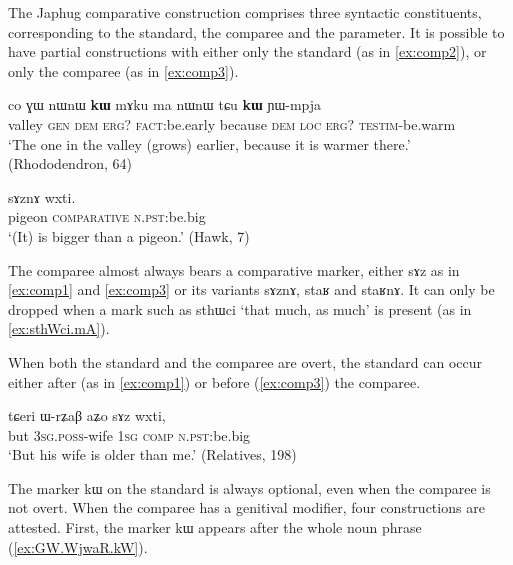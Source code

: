 \documentclass[oldfontcommands,oneside,a4paper,11pt]{article}
\newcommand{\ipa}[1]{{\phon #1}} %
\begin{document}
 

The Japhug comparative construction comprises three syntactic constituents, corresponding to the standard, the comparee and the parameter. It is possible to have partial constructions with either only the standard (as in \ref{ex:comp2}), or only the comparee (as in \ref{ex:comp3}).

 \begin{exe}
\ex \label{ex:comp2}
\gll 
\ipa{co}  	\ipa{ɣɯ}  	\ipa{nɯnɯ}  	\ipa{\textbf{kɯ}}  	\ipa{mɤku}  	\ipa{ma}  	\ipa{nɯnɯ} \ipa{tɕu}  	\ipa{\textbf{kɯ}}  	\ipa{ɲɯ-mpja}  \\
valley \textsc{gen} \textsc{dem} \textsc{erg?} \textsc{fact}:be.early because \textsc{dem} \textsc{loc} \textsc{erg?} \textsc{testim}-be.warm \\
\glt `The one in the valley (grows) earlier, because it is warmer there.' (Rhododendron, 64)
\end{exe}

\begin{exe}
\ex \label{ex:comp3}
\gll  \ipa{qɤjdo}  	\ipa{sɤznɤ}  	\ipa{wxti.}     \\
pigeon \textsc{comparative} \textsc{n.pst:}be.big \\
\glt `(It) is bigger than a pigeon.' (Hawk, 7)
\end{exe}


The comparee almost always bears a comparative marker, either \ipa{sɤz} as in \ref{ex:comp1} and \ref{ex:comp3} or its variants \ipa{sɤznɤ}, \ipa{staʁ} and \ipa{staʁnɤ}. It can only be dropped when a mark such as \ipa{sthɯci} `that much, as much' is present (as in \ref{ex:sthWci.mA}).

 When both the standard and the comparee are overt, the standard can occur either after (as in  \ref{ex:comp1}) or before (\ref{ex:comp3}) the comparee.  
 
\begin{exe}
\ex \label{ex:comp3}
\gll 
\ipa{tɕeri}  	\ipa{ɯ-rʑaβ}  	\ipa{aʑo}  	\ipa{sɤz}  	\ipa{wxti,}  \\
but \textsc{3sg.poss}-wife \textsc{1sg} \textsc{comp} \textsc{n.pst:}be.big \\
\glt `But his wife is older than me.' (Relatives, 198)
\end{exe}


The marker \ipa{kɯ} on the standard is always optional, even when the comparee is not overt. When the comparee has a genitival modifier, four constructions are attested. First,  the marker \ipa{kɯ} appears after the whole noun phrase (\ref{ex:GW.WjwaR.kW}). 
\end{document}
